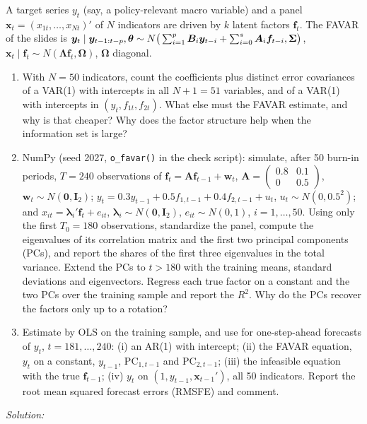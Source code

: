\documentclass[11pt,a4paper]{article}
\newif\ifsolucoes
\newcommand{\espacoresol}{4.5cm}   %
\newcommand{\resolespaco}{\ifsolucoes\else\par\textit{Solution:}\vspace{\espacoresol}\par\fi}
\begin{document}
A target series $y_t$ (say, a policy-relevant macro variable) and a panel $\bm x_t=(x_{1t},\dots,x_{Nt})'$ of $N$
indicators are driven by $k$ latent factors $\bm f_t$. The FAVAR of the slides is
$\bm y_t\mid\bm y_{t-1:t-p},\bm\theta\sim N\big(\sum_{i=1}^p\bm B_i\bm y_{t-i}+\sum_{i=0}^s\bm A_i\bm f_{t-i},\bm{\Sigma}\big)$,
$\bm x_t\mid\bm f_t\sim N(\bm\Lambda\bm f_t,\bm\Omega)$, $\bm\Omega$ diagonal.
\begin{enumerate}[label=(\alph*),leftmargin=2em]
\item With $N=50$ indicators, count the coefficients plus distinct error covariances of a VAR(1) with intercepts in
all $N+1=51$ variables, and of a VAR(1) with intercepts in $(y_t,f_{1t},f_{2t})$. What else must the FAVAR estimate,
and why is that cheaper? Why does the factor structure help when the information set is large?
\item NumPy (seed 2027, \texttt{o\_favar()} in the check script): simulate, after 50 burn-in periods, $T=240$
observations of $\bm f_t=\bm A\bm f_{t-1}+\bm w_t$, $\bm A=\begin{pmatrix}0.8&0.1\\0&0.5\end{pmatrix}$,
$\bm w_t\sim N(\bm0,\bm I_2)$; $y_t=0.3y_{t-1}+0.5f_{1,t-1}+0.4f_{2,t-1}+u_t$, $u_t\sim N(0,0.5^2)$; and
$x_{it}=\bm\lambda_i'\bm f_t+e_{it}$, $\bm\lambda_i\sim N(\bm0,\bm I_2)$, $e_{it}\sim N(0,1)$, $i=1,\dots,50$.
Using only the first $T_0=180$ observations, standardize the panel, compute the eigenvalues of its correlation
matrix and the first two principal components (PCs), and report the shares of the first three eigenvalues in the
total variance. Extend the PCs to $t>180$ with the training means, standard deviations and eigenvectors. Regress
each true factor on a constant and the two PCs over the training sample and report the $R^2$. Why do the PCs
recover the factors only up to a rotation?
\item Estimate by OLS on the training sample, and use for one-step-ahead forecasts of $y_t$, $t=181,\dots,240$:
(i) an AR(1) with intercept; (ii) the FAVAR equation, $y_t$ on a constant, $y_{t-1}$, $\mathrm{PC}_{1,t-1}$ and $\mathrm{PC}_{2,t-1}$;
(iii) the infeasible equation with the true $\bm f_{t-1}$; (iv) $y_t$ on $(1,y_{t-1},\bm x_{t-1}')$, all 50 indicators.
Report the root mean squared forecast errors (RMSFE) and comment.
\end{enumerate}
\resolespaco
\end{document}
